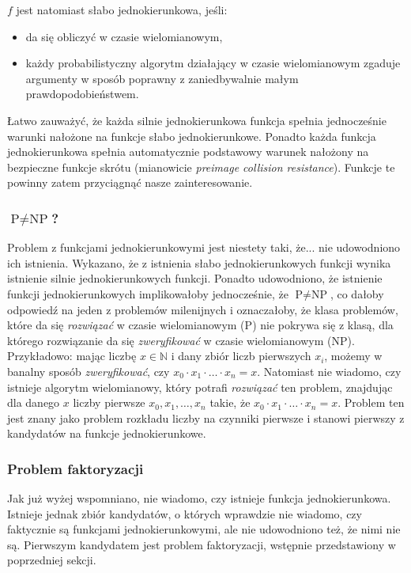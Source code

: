 \documentclass[12pt,a4paper,twoside]{article}
\begin{document}
\noindent
$f$ jest natomiast słabo jednokierunkowa, jeśli:
\begin{itemize}
\item da się obliczyć w czasie wielomianowym,
\item każdy probabilistyczny algorytm działający w czasie wielomianowym zgaduje
argumenty w sposób poprawny z zaniedbywalnie małym prawdopodobieństwem.
\end{itemize}

Łatwo zauważyć, że każda silnie jednokierunkowa funkcja spełnia jednocześnie
warunki nałożone na funkcje słabo jednokierunkowe. Ponadto każda funkcja
jednokierunkowa spełnia automatycznie podstawowy warunek nałożony na bezpieczne
funkcje skrótu (mianowicie \textit{preimage collision resistance}). Funkcje te
powinny zatem przyciągnąć nasze zainteresowanie.

\subsubsection{$\textrm{P} \neq \textrm{NP}$?}
Problem z funkcjami jednokierunkowymi jest niestety taki, że... nie udowodniono
ich istnienia. Wykazano, że z istnienia słabo jednokierunkowych funkcji wynika
istnienie silnie jednokierunkowych funkcji. Ponadto udowodniono, że istnienie
funkcji jednokierunkowych implikowałoby jednocześnie, że $\textrm{P} \neq
\textrm{NP}$, co dałoby odpowiedź na jeden z problemów milenijnych i
oznaczałoby, że klasa problemów, które da się \emph{rozwiązać} w czasie
wielomianowym ($\textrm{P}$) nie pokrywa się z klasą, dla którego rozwiązanie
da się \emph{zweryfikować} w czasie wielomianowym ($\textrm{NP}$).
Przykładowo: mając liczbę $x \in \mathbb{N}$ i dany zbiór liczb pierwszych
$x_i$, możemy w banalny sposób \emph{zweryfikować}, czy $x_0 \cdot x_1 \cdot
\ldots \cdot x_n = x$. Natomiast nie wiadomo, czy istnieje algorytm
wielomianowy, który potrafi \emph{rozwiązać} ten problem, znajdując dla danego
$x$ liczby pierwsze $x_0, x_1, \ldots, x_n$ takie, że $x_0 \cdot x_1 \cdot
\ldots \cdot x_n = x$. Problem ten jest znany jako problem rozkładu liczby na
czynniki pierwsze i stanowi pierwszy z kandydatów na funkcje jednokierunkowe.

\subsubsection{Problem faktoryzacji}
Jak już wyżej wspomniano, nie wiadomo, czy istnieje funkcja jednokierunkowa.
Istnieje jednak zbiór kandydatów, o których wprawdzie nie wiadomo, czy
faktycznie są funkcjami jednokierunkowymi, ale nie udowodniono też, że nimi nie
są. Pierwszym kandydatem jest problem faktoryzacji, wstępnie przedstawiony w
poprzedniej sekcji.
\end{document}
